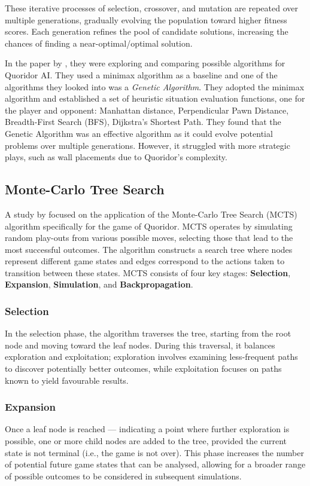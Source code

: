 \documentclass[review]{cmpreport}
\begin{document}
\noindent These iterative processes of selection, crossover, and mutation are repeated over multiple generations, gradually evolving the population toward higher fitness scores. Each generation refines the pool of candidate solutions, increasing the chances of finding a near-optimal/optimal solution.

\noindent In the paper by \cite{josequoridor}, they were exploring and comparing possible algorithms for Quoridor AI. They used a minimax algorithm as a baseline and one of the algorithms they looked into was a \textit{Genetic Algorithm}.
They adopted the minimax algorithm and established a set of heuristic situation evaluation functions, one for the player and opponent: Manhattan distance, Perpendicular Pawn Distance, Breadth-First Search (BFS), Dijkstra's Shortest Path. They found that the Genetic Algorithm was an effective algorithm as it could evolve potential problems over multiple generations. However, it struggled with more strategic plays, such as wall placements due to Quoridor's complexity.

\subsection{Monte-Carlo Tree Search}
A study by \cite{respall2018monte} focused on the application of the Monte-Carlo Tree Search (MCTS) algorithm specifically for the game of Quoridor. MCTS operates by simulating random play-outs from various possible moves, selecting those that lead to the most successful outcomes. The algorithm constructs a search tree where nodes represent different game states and edges correspond to the actions taken to transition between these states. MCTS consists of four key stages: \textbf{Selection}, \textbf{Expansion}, \textbf{Simulation}, and \textbf{Backpropagation}.

\subsubsection{Selection}
In the selection phase, the algorithm traverses the tree, starting from the root node and moving toward the leaf nodes. During this traversal, it balances exploration and exploitation; exploration involves examining less-frequent paths to discover potentially better outcomes, while exploitation focuses on paths known to yield favourable results.

\subsubsection{Expansion}
Once a leaf node is reached — indicating a point where further exploration is possible, one or more child nodes are added to the tree, provided the current state is not terminal (i.e., the game is not over). This phase increases the number of potential future game states that can be analysed, allowing for a broader range of possible outcomes to be considered in subsequent simulations.
\end{document}
